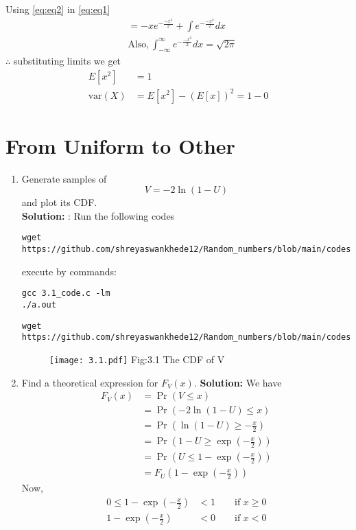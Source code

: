 \documentclass[journal,12pt,twocolumn]{IEEEtran}
\renewcommand\thesection{\arabic{section}}
\providecommand{\pr}[1]{\ensuremath{\Pr\left(#1\right)}}
\providecommand{\brak}[1]{\ensuremath{\left(#1\right)}}
\theoremstyle{remark}
\newcommand{\solution}{\noindent \textbf{Solution: }}
\numberwithin{equation}{section}
\begin{document}
 Using \eqref{eq:eq2} in \eqref{eq:eq1}
 \begin{align}
&= -x e^{-\frac{-x^2}{2}}+\int e^{-\frac{-x^2}{2}} dx\\
&\text{Also} ,\int_{-\infty}^{\infty} e^{-\frac{-x^2}{2}} dx=\sqrt{2 \pi} 
\end{align}
$\therefore$ substituting limits we get
\begin{align}
 E[x^2]&=1\\
 \text{var}(X)&=E[x^2]-(E[x])^2=1-0
\end{align}
 
\section{From Uniform to Other}
\begin{enumerate}[label=\thesection.\arabic*
,ref=\thesection.\theenumi]
%
\item
Generate samples of 
%
\begin{equation}
V = -2\ln\brak{1-U}
\end{equation}
%
and plot its CDF. \\
\solution: Run the following codes
\begin{lstlisting}
wget https://github.com/shreyaswankhede12/Random_numbers/blob/main/codes/3.1_code.c
\end{lstlisting}
execute by commands:
\begin{lstlisting}
gcc 3.1_code.c -lm
./a.out
\end{lstlisting}
\begin{lstlisting}
wget https://github.com/shreyaswankhede12/Random_numbers/blob/main/codes/3.1_plot.py
\end{lstlisting}
\begin{figure}
\centering
\texttt{[image: 3.1.pdf]}
Fig:3.1  The CDF of V
\end{figure}
\item Find a theoretical expression for $F_V(x)$.
\solution We have
	\begin{align}
		F_V(x) &= \pr{V \le x} \\
		&= \pr{-2\ln\brak{1-U} \le x} \\
		&= \pr{\ln\brak{1-U} \ge -\frac{x}{2}} \\
		&= \pr{1-U \ge \exp\brak{-\frac{x}{2}}} \\
		&= \pr{U \le 1 - \exp\brak{-\frac{x}{2}}} \\
		&= F_U\brak{1 - \exp\brak{-\frac{x}{2}}}
	\end{align}
	Now,
	\begin{align}
		0 \le 1-\exp\brak{-\frac{x}{2}} &< 1 \qquad \text{if } x \ge 0	\\	
		1-\exp\brak{-\frac{x}{2}} &< 0 \qquad \text{if } x < 0	
	\end{align}
	

\end{enumerate}
\end{document}
